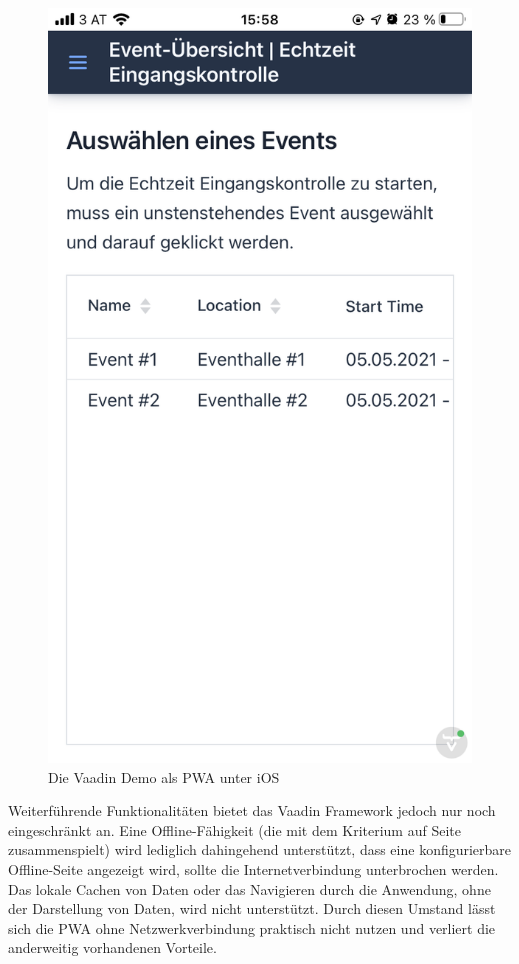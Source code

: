 \documentclass[a4paper,12pt,twoside]{scrreprt}
\begin{document}
\begin{figure}[ht]
    \centering
    \includegraphics[scale=0.25]{images/Luidold_Results-Vaadin-PWA.png}
    \caption[Die Vaadin Demo als \acs{PWA} unter iOS]{Die Vaadin Demo als \ac{PWA} unter iOS}
    \label{fig:results-vaadin-pwa}
\end{figure}

Weiterführende Funktionalitäten bietet das Vaadin Framework jedoch nur noch eingeschränkt an. Eine Offline-Fähigkeit (die mit dem Kriterium \textit{} auf Seite \pageref{sub-sec:kriterien-datenanbindung} zusammenspielt) wird lediglich dahingehend unterstützt, dass eine konfigurierbare Offline-Seite angezeigt wird, sollte die Internetverbindung unterbrochen werden. Das lokale Cachen von Daten oder das Navigieren durch die Anwendung, ohne der Darstellung von Daten, wird nicht unterstützt. Durch diesen Umstand lässt sich die \ac{PWA} ohne Netzwerkverbindung praktisch nicht nutzen und verliert die anderweitig vorhandenen Vorteile.
\end{document}
